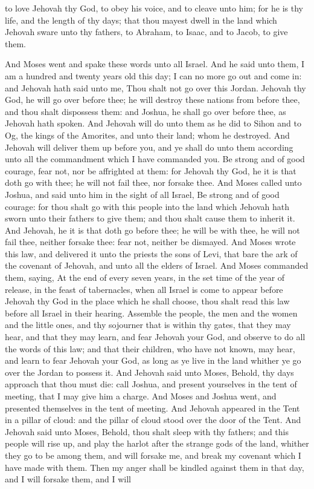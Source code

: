 to love Jehovah thy God, to obey his voice, and to cleave unto him; for he is thy life, and the length of thy days; that thou mayest dwell in the land which Jehovah sware unto thy fathers, to Abraham, to Isaac, and to Jacob, to give them. 

And Moses went and spake these words unto all Israel. And he said unto them, I am a hundred and twenty years old this day; I can no more go out and come in: and Jehovah hath said unto me, Thou shalt not go over this Jordan. Jehovah thy God, he will go over before thee; he will destroy these nations from before thee, and thou shalt dispossess them: and Joshua, he shall go over before thee, as Jehovah hath spoken. And Jehovah will do unto them as he did to Sihon and to Og, the kings of the Amorites, and unto their land; whom he destroyed. And Jehovah will deliver them up before you, and ye shall do unto them according unto all the commandment which I have commanded you. Be strong and of good courage, fear not, nor be affrighted at them: for Jehovah thy God, he it is that doth go with thee; he will not fail thee, nor forsake thee. And Moses called unto Joshua, and said unto him in the sight of all Israel, Be strong and of good courage: for thou shalt go with this people into the land which Jehovah hath sworn unto their fathers to give them; and thou shalt cause them to inherit it. And Jehovah, he it is that doth go before thee; he will be with thee, he will not fail thee, neither forsake thee: fear not, neither be dismayed.  And Moses wrote this law, and delivered it unto the priests the sons of Levi, that bare the ark of the covenant of Jehovah, and unto all the elders of Israel. And Moses commanded them, saying, At the end of every seven years, in the set time of the year of release, in the feast of tabernacles, when all Israel is come to appear before Jehovah thy God in the place which he shall choose, thou shalt read this law before all Israel in their hearing. Assemble the people, the men and the women and the little ones, and thy sojourner that is within thy gates, that they may hear, and that they may learn, and fear Jehovah your God, and observe to do all the words of this law; and that their children, who have not known, may hear, and learn to fear Jehovah your God, as long as ye live in the land whither ye go over the Jordan to possess it.  And Jehovah said unto Moses, Behold, thy days approach that thou must die: call Joshua, and present yourselves in the tent of meeting, that I may give him a charge. And Moses and Joshua went, and presented themselves in the tent of meeting. And Jehovah appeared in the Tent in a pillar of cloud: and the pillar of cloud stood over the door of the Tent. And Jehovah said unto Moses, Behold, thou shalt sleep with thy fathers; and this people will rise up, and play the harlot after the strange gods of the land, whither they go to be among them, and will forsake me, and break my covenant which I have made with them. Then my anger shall be kindled against them in that day, and I will forsake them, and I will 